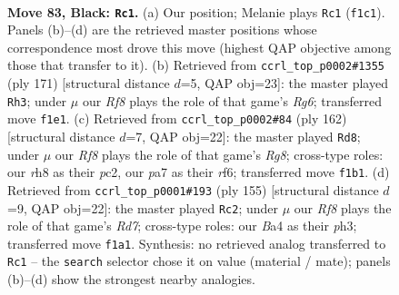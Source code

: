 \documentclass[11pt]{article}
\begin{document}
\clearpage

\begin{figure}[p]\centering
\begin{subfigure}{0.46\textwidth}\centering
\resizebox{\linewidth}{!}{%
\newchessgame
\chessboard[
  setfen={7R/P4k2/8/5p2/b7/8/6K1/5r2 b - - 2 83},
  showmover=false,
  pgfstyle=straightmove, color=movearrow, markmove={f1-c1}
]}
\caption{}
\end{subfigure}\hfill
\begin{subfigure}{0.46\textwidth}\centering
\resizebox{\linewidth}{!}{%
\newchessgame
\chessboard[
  setfen={2R5/4k3/8/8/5P2/2p3r1/5K2/8 b - - 3 86},
  showmover=false,
  pgfstyle=straightmove, color=movearrow, markmove={g3-h3}
]}
\caption{}
\end{subfigure}
\\[4pt]
\begin{subfigure}{0.46\textwidth}\centering
\resizebox{\linewidth}{!}{%
\newchessgame
\chessboard[
  setfen={6R1/7k/5r2/8/6P1/8/2p5/2K5 w - - 11 82},
  showmover=false,
  pgfstyle=straightmove, color=movearrow, markmove={g8-d8}
]}
\caption{}
\end{subfigure}\hfill
\begin{subfigure}{0.46\textwidth}\centering
\resizebox{\linewidth}{!}{%
\newchessgame
\chessboard[
  setfen={R7/8/2P5/8/1k5p/4K2P/p2r4/8 b - - 2 78},
  showmover=false,
  pgfstyle=straightmove, color=movearrow, markmove={d2-c2}
]}
\caption{}
\end{subfigure}
\caption{\textbf{Move 83, Black: \texttt{Rc1}.} (a) Our position; Melanie plays \texttt{Rc1} (\texttt{f1c1}). Panels (b)--(d) are the retrieved master positions whose correspondence most drove this move (highest QAP objective among those that transfer to it). (b) Retrieved from \texttt{ccrl\_top\_p0002\#1355} (ply 171) [structural distance $d$=5, QAP obj=23]: the master played \texttt{Rh3}; under $\mu$ our \emph{Rf8} plays the role of that game's \emph{Rg6}; transferred move \texttt{f1e1}. (c) Retrieved from \texttt{ccrl\_top\_p0002\#84} (ply 162) [structural distance $d$=7, QAP obj=22]: the master played \texttt{Rd8}; under $\mu$ our \emph{Rf8} plays the role of that game's \emph{Rg8}; cross-type roles: our \emph{r}h8 as their \emph{p}c2, our \emph{p}a7 as their \emph{r}f6; transferred move \texttt{f1b1}. (d) Retrieved from \texttt{ccrl\_top\_p0001\#193} (ply 155) [structural distance $d$=9, QAP obj=22]: the master played \texttt{Rc2}; under $\mu$ our \emph{Rf8} plays the role of that game's \emph{Rd7}; cross-type roles: our \emph{B}a4 as their \emph{p}h3; transferred move \texttt{f1a1}. Synthesis: no retrieved analog transferred to \texttt{Rc1} -- the \texttt{search} selector chose it on value (material / mate); panels (b)--(d) show the strongest nearby analogies.}
\label{fig:thought-m165}
\end{figure}
\end{document}
